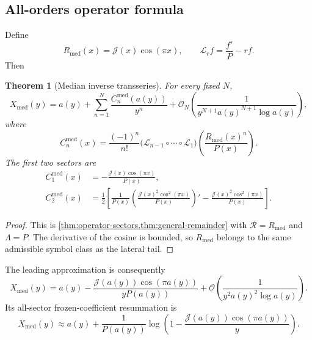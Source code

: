 \documentclass[11pt,a4paper]{article}
\numberwithin{equation}{section}
\newtheorem{theorem}{Theorem}[section]
\theoremstyle{definition}
\theoremstyle{remark}
\newcommand{\Ord}{\mathcal O}
\newcommand{\Tail}{\mathcal J}
\newcommand{\Lam}{\Lambda}
\newcommand{\Res}{\mathcal R}
\newcommand{\med}{\mathrm{med}}
\begin{document}
\subsection{All-orders operator formula}

Define
\begin{equation}\label{eq:median-R}
 R_{\med}(x)=\Tail(x)\cos(\pi x),
 \qquad
 \mathscr L_r f=\frac{f'}{P}-rf.
\end{equation}
Then
\begin{theorem}[Median inverse transseries]\label{thm:median-inverse}
For every fixed $N$,
\begin{equation}\label{eq:median-all-orders}
 X_{\med}(y)=a(y)+\sum_{n=1}^{N}\frac{C_n^{\med}(a(y))}{y^n}
 +\Ord_N\!\left(\frac1{y^{N+1}a(y)^{N+1}\log a(y)}\right),
\end{equation}
where
\begin{equation}\label{eq:Cn-median}
 C_n^{\med}(x)=\frac{(-1)^n}{n!}
 \bigl(\mathscr L_{n-1}\circ\cdots\circ\mathscr L_1\bigr)
 \left(\frac{R_{\med}(x)^n}{P(x)}\right).
\end{equation}
The first two sectors are
\begin{align}
 C_1^{\med}(x)&=-\frac{\Tail(x)\cos(\pi x)}{P(x)},
 \label{eq:C1-median}\\
 C_2^{\med}(x)&=\frac12\left[
 \frac1{P(x)}\left(\frac{\Tail(x)^2\cos^2(\pi x)}{P(x)}\right)'
 -\frac{\Tail(x)^2\cos^2(\pi x)}{P(x)}
 \right].
 \label{eq:C2-median}
\end{align}
\end{theorem}

\begin{proof}
This is \cref{thm:operator-sectors,thm:general-remainder} with
$\Res=R_{\med}$ and $\Lam=P$.  The derivative of the cosine is bounded, so
$R_{\med}$ belongs to the same admissible symbol class as the lateral tail.
\end{proof}

The leading approximation is consequently
\begin{equation}\label{eq:median-leading}
 X_{\med}(y)=a(y)
 -\frac{\Tail(a(y))\cos(\pi a(y))}{yP(a(y))}
 +\Ord\!\left(\frac1{y^2a(y)^2\log a(y)}\right).
\end{equation}
Its all-sector frozen-coefficient resummation is
\begin{equation}\label{eq:median-log-resum}
 X_{\med}(y)\approx a(y)+\frac1{P(a(y))}
 \log\left(1-\frac{\Tail(a(y))\cos(\pi a(y))}{y}\right).
\end{equation}
\end{document}
